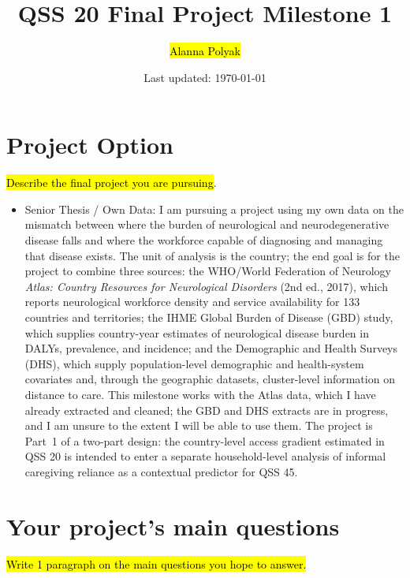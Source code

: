 \documentclass[12pt]{article}
\title{\bf QSS 20 Final Project Milestone 1}
\author{\hl{Alanna Polyak}}
\date{Last updated: \today}
\begin{document}
\maketitle

\section{Project Option}

\hl{Describe the final project you are pursuing}.

\begin{itemize}
\item Senior Thesis / Own Data: 
I am pursuing a project using my own data on the
mismatch between where the burden of neurological and neurodegenerative disease
falls and where the workforce capable of diagnosing and managing that disease exists. The unit of analysis is the country; the end goal is for the project to combine
three sources: the WHO/World Federation of Neurology \emph{Atlas: Country
Resources for Neurological Disorders} (2nd ed., 2017), which reports
neurological workforce density and service availability for 133 countries and
territories; the IHME Global Burden of Disease (GBD) study, which supplies
country-year estimates of neurological disease burden in DALYs, prevalence, and
incidence; and the Demographic and Health Surveys (DHS), which supply
population-level demographic and health-system covariates and, through the
geographic datasets, cluster-level information on distance to care. This
milestone works with the Atlas data, which I have already extracted and cleaned;
the GBD and DHS extracts are in progress, and I am unsure to the extent I will be able to use them. The
project is Part~1 of a two-part design: the country-level
access gradient estimated in QSS 20 is intended to enter a separate household-level
analysis of informal caregiving reliance as a contextual predictor for QSS 45.

\end{itemize}

\section{Your project's main questions}

\hl{Write 1 paragraph on the main questions you hope to answer.}
\end{document}
